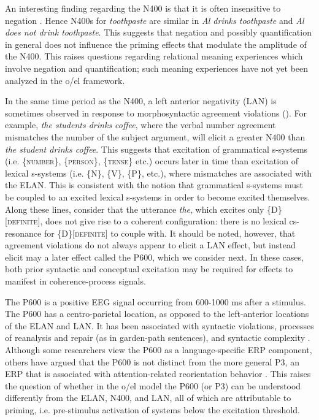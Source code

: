   An interesting finding regarding the N400 is that it is often insensitive to negation \citep{KutasFedermeier2011}. Hence N400s for \textit{toothpaste} are similar in \textit{Al drinks toothpaste} and \textit{Al does not drink toothpaste}. This suggests that negation and possibly quantification in general does not influence the priming effects that modulate the amplitude of the N400. This raises questions regarding relational meaning experiences which involve negation and quantification; such meaning experiences have not yet been analyzed in the o/el framework.

  In the same time period as the N400, a left anterior negativity (LAN) is sometimes observed in response to morphosyntactic agreement violations (\citealt{Friederici2002,GunterEtAl2000,KutasFedermeier2011,OsterhoutHolcomb1992}). For example, \textit{the students drinks coffee}, where the verbal number agreement mismatches the number of the subject argument, will elicit a greater N400 than \textit{the student drinks coffee}. This suggests that excitation of grammatical s-systems (i.e. \{\textsc{number}\}, \{\textsc{person}\}, \{\textsc{tense}\} etc.) occurs later in time than excitation of lexical s-systems (i.e. \{N\}, \{V\}, \{P\}, etc.), where mismatches are associated with the ELAN. This is consistent with the notion that grammatical s-systems must be coupled to an excited lexical s-systems in order to become excited themselves. Along these lines, consider that the utterance \textit{the}, which excites only \{D\}[\textsc{definite}], does not give rise to a coherent configuration: there is no lexical cs-resonance for \{D\}[\textsc{definite}] to couple with. It should be noted, however, that agreement violations do not always appear to elicit a LAN effect, but instead elicit may a later effect called the P600, which we consider next. In these cases, both prior syntactic and conceptual excitation may be required for effects to manifest in coherence-process signals.

  The P600 is a positive EEG signal occurring from 600-1000 ms after a stimulus. The P600 has a centro-parietal location, as opposed to the left-anterior locations of the ELAN and LAN. It has been associated with syntactic violations, processes of reanalysis and repair (as in garden-path sentences), and syntactic complexity \citep{Friederici2002}. Although some researchers view the P600 as a language-specific ERP component, others have argued that the P600 is not distinct from the more general P3, an ERP that is associated with attention-related reorientation behavior \citep{SassenhagenBornkessel-Schlesewsky2015}. This raises the question of whether in the o/el model the P600 (or P3) can be understood differently from the ELAN, N400, and LAN, all of which are attributable to priming, i.e. pre-stimulus activation of systems below the excitation threshold.

